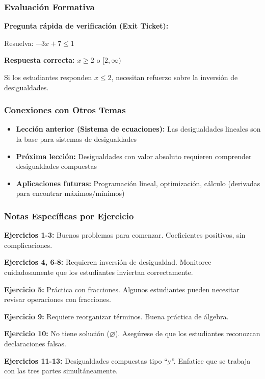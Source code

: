 \subsubsection*{Evaluación Formativa}

\textbf{Pregunta rápida de verificación (Exit Ticket):}

Resuelva: $-3x + 7 \le 1$

\textbf{Respuesta correcta:} $x \ge 2$ o $[2, \infty)$

Si los estudiantes responden $x \le 2$, necesitan refuerzo sobre la inversión de desigualdades.

\subsubsection*{Conexiones con Otros Temas}

\begin{itemize}
    \item \textbf{Lección anterior (Sistema de ecuaciones):} Las desigualdades lineales son la base para sistemas de desigualdades
    \item \textbf{Próxima lección:} Desigualdades con valor absoluto requieren comprender desigualdades compuestas
    \item \textbf{Aplicaciones futuras:} Programación lineal, optimización, cálculo (derivadas para encontrar máximos/mínimos)
\end{itemize}

\subsubsection*{Notas Específicas por Ejercicio}

\textbf{Ejercicios 1-3:} Buenos problemas para comenzar. Coeficientes positivos, sin complicaciones.

\textbf{Ejercicios 4, 6-8:} Requieren inversión de desigualdad. Monitoree cuidadosamente que los estudiantes inviertan correctamente.

\textbf{Ejercicio 5:} Práctica con fracciones. Algunos estudiantes pueden necesitar revisar operaciones con fracciones.

\textbf{Ejercicio 9:} Requiere reorganizar términos. Buena práctica de álgebra.

\textbf{Ejercicio 10:} No tiene solución ($\varnothing$). Asegúrese de que los estudiantes reconozcan declaraciones falsas.

\textbf{Ejercicios 11-13:} Desigualdades compuestas tipo ``y''. Enfatice que se trabaja con las tres partes simultáneamente.

